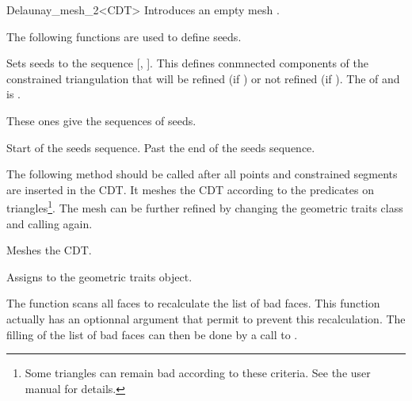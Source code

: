 \begin{ccRefClass}{Delaunay_mesh_2<CDT>}
{Introduces an empty mesh \ccVar.}



The following functions are used to define seeds.


{ Sets seeds to the sequence [, ]. This defines
  conmnected components of the constrained triangulation that will be
  refined (if ) or not refined (if ).
  \ccPrecond The  of  and 
  is .}

These ones give the sequences of seeds.

{ Start of the seeds sequence. }
\ccGlue
{}
{ Past the end of the seeds sequence. }


The following method should be called after all points and constrained
segments are inserted in the CDT. It meshes the CDT according to the
 predicates on triangles\footnote{Some
  triangles can remain bad according to these criteria. See the user
  manual for details.}. The mesh can be further refined by changing
the geometric traits class and calling  again.

{ Meshes the CDT. }

{ Assigns  to the geometric traits object. }

\begin{ccAdvanced}
  The function  scans all faces to recalculate the
  list of bad faces. This function actually has an optionnal argument that
  permit to prevent this recalculation. The filling of the list of bad
  faces can then be done by a call to .
  

\end{ccAdvanced}
\end{ccRefClass}
